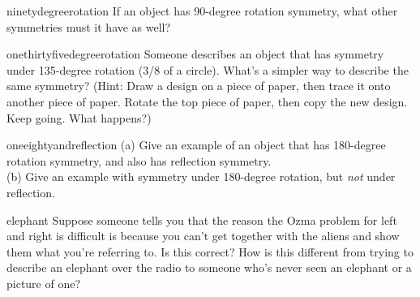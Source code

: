 \begin{hwsection}
\begin{hw}{ninetydegreerotation}
If an object has 90-degree rotation symmetry, what other symmetries must it have as well?\\
\end{hw}

\begin{hw}{onethirtyfivedegreerotation}
Someone describes an object that has symmetry under 135-degree rotation (3/8 of a circle).
What's a simpler way to describe the same symmetry? (Hint: Draw a design on a piece of
paper, then trace it onto another piece of paper. Rotate the top piece of paper, then
copy the new design. Keep going. What happens?)
\end{hw}

\begin{hw}{oneeightyandreflection}
(a) Give an example of an object that has 180-degree rotation symmetry, and also has reflection
symmetry. \\
(b) Give an example with symmetry under 180-degree rotation, but \emph{not} under reflection.
\end{hw}

\begin{hw}{elephant}
Suppose someone tells you that the reason the Ozma problem for left and right is
difficult is because you can't get together with the aliens and show them what you're
referring to. Is this correct? How is this different from trying to describe an elephant
over the radio to someone who's never seen an elephant or a picture of one?
\end{hw}

\end{hwsection}



